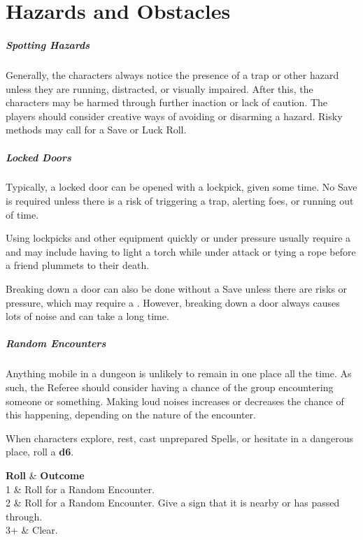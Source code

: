 \documentclass[itdr/core]{subfiles}
\begin{document}
\chapter{Hazards and Obstacles}
\label{ch:hazards_and_obstacles}

\paragraph{Spotting Hazards}
Generally, the characters always notice the presence of a trap or other hazard unless they are running, distracted, or visually impaired. After this, the characters may be harmed through further inaction or lack of caution. The players should consider creative ways of avoiding or disarming a hazard. Risky methods may call for a Save or Luck Roll.

\paragraph{Locked Doors}
Typically, a locked door can be opened with a lockpick, given some time. No Save is required unless there is a risk of triggering a trap, alerting foes, or running out of time.

Using lockpicks and other equipment quickly or under pressure usually require a  and may include having to light a torch while under attack or tying a rope before a friend plummets to their death.

Breaking down a door can also be done without a Save unless there are risks or pressure, which may require a . However, breaking down a door always causes lots of noise and can take a long time.

\paragraph{Random Encounters}
Anything mobile in a dungeon is unlikely to remain in one place all the time. As such, the Referee should consider having a chance of the group encountering someone or something. Making loud noises increases or decreases the chance of this happening, depending on the nature of the encounter.

When characters explore, rest, cast unprepared Spells, or hesitate in a dangerous place, roll a \textbf{d6}.

\begin{dtable}[cL]
	\textbf{Roll} & \textbf{Outcome} \\
	1	& Roll for a Random Encounter.\\
	2	& Roll for a Random Encounter. Give a sign that it is nearby or has passed through.\\
	3+	& Clear.\\
\end{dtable}
\end{document}
